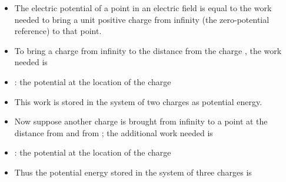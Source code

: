 \begin{ELunit}


\begin{itemize}
\tightlist
\item
  The electric potential of a point in an electric field is equal to the work needed to bring a unit positive charge from infinity (the zero-potential reference) to that point.
\item
  To bring a charge  from infinity to the distance  from the charge , the work needed is
\end{itemize}



\begin{itemize}
\tightlist
\item
  : the potential at the location of the charge 
\end{itemize}


\begin{itemize}
\item
  This work is stored in the system of two charges as potential energy.
\item
  Now suppose another charge  is brought from infinity to a point at the distance  from  and  from ; the additional work needed is
\end{itemize}



\begin{itemize}
\tightlist
\item
  : the potential at the location of the charge 
\item
  Thus the potential energy stored in the system of three charges is
\end{itemize}


\end{ELunit}

